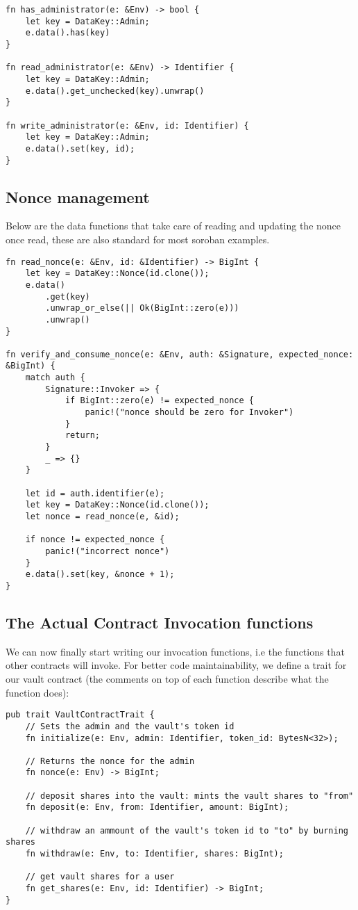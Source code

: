 \documentclass{article}
\begin{document}
\begin{lstlisting}
fn has_administrator(e: &Env) -> bool {
    let key = DataKey::Admin;
    e.data().has(key)
}

fn read_administrator(e: &Env) -> Identifier {
    let key = DataKey::Admin;
    e.data().get_unchecked(key).unwrap()
}

fn write_administrator(e: &Env, id: Identifier) {
    let key = DataKey::Admin;
    e.data().set(key, id);
}

\end{lstlisting}

\subsection{Nonce management}
Below are the data functions that take care of reading and updating the nonce once read, these are also standard for most soroban examples.

\begin{lstlisting}
fn read_nonce(e: &Env, id: &Identifier) -> BigInt {
    let key = DataKey::Nonce(id.clone());
    e.data()
        .get(key)
        .unwrap_or_else(|| Ok(BigInt::zero(e)))
        .unwrap()
}

fn verify_and_consume_nonce(e: &Env, auth: &Signature, expected_nonce: &BigInt) {
    match auth {
        Signature::Invoker => {
            if BigInt::zero(e) != expected_nonce {
                panic!("nonce should be zero for Invoker")
            }
            return;
        }
        _ => {}
    }

    let id = auth.identifier(e);
    let key = DataKey::Nonce(id.clone());
    let nonce = read_nonce(e, &id);

    if nonce != expected_nonce {
        panic!("incorrect nonce")
    }
    e.data().set(key, &nonce + 1);
}
\end{lstlisting}

\subsection{The Actual Contract Invocation functions}
We can now finally start writing our invocation functions, i.e the functions that other contracts will invoke. For better code maintainability, we define a trait for our vault contract (the comments on top of each function describe what the function does):

\begin{lstlisting}
pub trait VaultContractTrait {
    // Sets the admin and the vault's token id
    fn initialize(e: Env, admin: Identifier, token_id: BytesN<32>);

    // Returns the nonce for the admin
    fn nonce(e: Env) -> BigInt;

    // deposit shares into the vault: mints the vault shares to "from"
    fn deposit(e: Env, from: Identifier, amount: BigInt);

    // withdraw an ammount of the vault's token id to "to" by burning shares
    fn withdraw(e: Env, to: Identifier, shares: BigInt);

    // get vault shares for a user
    fn get_shares(e: Env, id: Identifier) -> BigInt;
}
\end{lstlisting}
\end{document}
